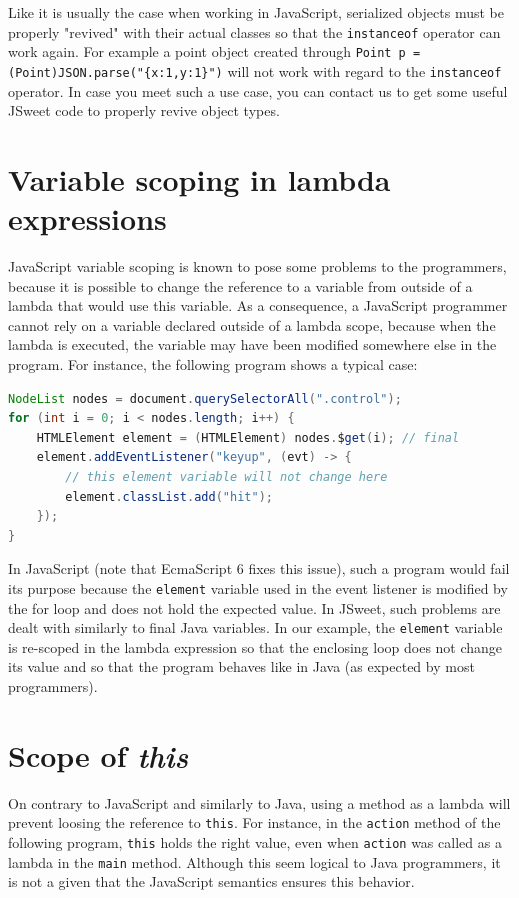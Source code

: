 \documentclass[a4paper]{report}
\begin{document}
Like it is usually the case when working in JavaScript, serialized objects must be properly "revived" with their actual classes so that the \texttt{instanceof} operator can work again. For example a point object created through \texttt{Point p = (Point)JSON.parse("\{x:1,y:1\}")} will not work with regard to the \texttt{instanceof} operator. In case you meet such a use case, you can contact us to get some useful JSweet code to properly revive object types.

\section{Variable scoping in lambda expressions}

JavaScript variable scoping is known to pose some problems to the programmers, because it is possible to change the reference to a variable from outside of a lambda that would use this variable. As a consequence, a JavaScript programmer cannot rely on a variable declared outside of a lambda scope, because when the lambda is executed, the variable may have been modified somewhere else in the program. For instance, the following program shows a typical case: 

\begin{lstlisting}[language=Java]
NodeList nodes = document.querySelectorAll(".control");
for (int i = 0; i < nodes.length; i++) {
	HTMLElement element = (HTMLElement) nodes.$get(i); // final
	element.addEventListener("keyup", (evt) -> {
	    // this element variable will not change here 
		element.classList.add("hit");
	});
}
\end{lstlisting}

In JavaScript (note that EcmaScript 6 fixes this issue), such a program would fail its purpose because the \texttt{element} variable used in the event listener is modified by the for loop and does not hold the expected value. In JSweet, such problems are dealt with similarly to final Java variables. In our example, the \texttt{element} variable is re-scoped in the lambda expression so that the enclosing loop does not change its value and so that the program behaves like in Java (as expected by most programmers).

\section{Scope of \emph{this}}

On contrary to JavaScript and similarly to Java, using a method as a lambda will prevent loosing the reference to \texttt{this}. For instance, in the \texttt{action} method of the following program, \texttt{this} holds the right value, even when \texttt{action} was called as a lambda in the \texttt{main} method. Although this seem logical to Java programmers, it is not a given that the JavaScript semantics ensures this behavior. 
\end{document}
